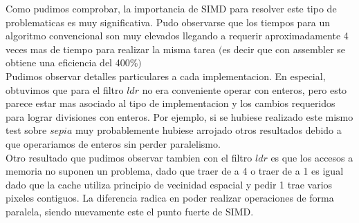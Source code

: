 Como pudimos comprobar, la importancia de SIMD para resolver este tipo de problematicas es muy significativa. 
Pudo observarse que los tiempos para un algoritmo convencional son muy elevados llegando a requerir aproximadamente 4 veces mas de tiempo para realizar la misma tarea $($es decir que con assembler se obtiene una eficiencia del 400$ \% )$\\

Pudimos observar detalles particulares a cada implementacion. En especial, obtuvimos que para el filtro $ldr$ no era conveniente operar con enteros, pero esto parece estar mas asociado al tipo de implementacion y los cambios requeridos para lograr divisiones con enteros. Por ejemplo, si se hubiese realizado este mismo test sobre $sepia$ muy probablemente hubiese arrojado otros resultados debido a que operariamos de enteros sin perder paralelismo.\\

Otro resultado que pudimos observar tambien con el filtro $ldr$ es que los accesos a memoria no suponen un problema, dado que traer de a 4 o traer de a 1 es igual dado que la cache utiliza principio de vecinidad espacial y pedir 1 trae varios pixeles contiguos. La diferencia radica en poder realizar operaciones de forma paralela, siendo nuevamente este el punto fuerte de SIMD. \\


